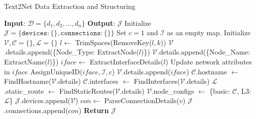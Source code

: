 \begin{small}
\begin{algorithm}[t]
\caption{Text2Net Data Extraction and Structuring}
\label{algorithm}
\begin{algorithmic}[1]  %
\State \textbf{Input}: $\mathcal{D} = \{d_1, d_2, \ldots, d_n\}$ 
\State \textbf{Output}: $\mathcal{J}$ 
\State Initialize $\mathcal{J} = \{\texttt{devices}: \{\}, \texttt{connections}: \{\}\}$
\State Set $c = 1$ and $\mathcal{I}$ as an empty map.
        \State Initialize $\mathcal{V}, \mathcal{C} = \{\}, \mathcal{L} = \{\}$
            \State $l \gets$ TrimSpaces(RemoveKey($l, k$))
             \State $\mathcal{V}$.details.append(\{Node\_Type: ExtractNode($l$)\})
             \State $\mathcal{V}$.details.append(\{Node\_Name: ExtractName($l$)\})
            \EndIf
                \State $iface \gets$ ExtractInterfaceDetails($l$)
                \State Update network attributes in $iface$ 
                \State AssignUniqueID($iface, \mathcal{I}, c$)
                \State $\mathcal{V}$.details.append($iface$)
            \EndIf
        \EndFor
        \State $\mathcal{C}$.hostname $\gets$ FindHostname($\mathcal{V}$.details)
        \State $\mathcal{C}$.interfaces $\gets$ FindInterfaces($\mathcal{V}$.details)
        \State $\mathcal{L}$.static\_route $\gets$ FindStaticRoutes($\mathcal{V}$.details)
        \State $\mathcal{V}$.node\_configs $\gets$ \{basic: $\mathcal{C}$, L3: $\mathcal{L}$\}
        \State $\mathcal{J}$.devices.append($\mathcal{V}$)
    \Else
        \State $con \gets$ ParseConnectionDetails($v$)
        \State $\mathcal{J}$.connections.append($con$)
    \EndIf
\EndFor
\State \textbf{Return} $\mathcal{J}$
\end{algorithmic}
\end{algorithm}
\end{small}
